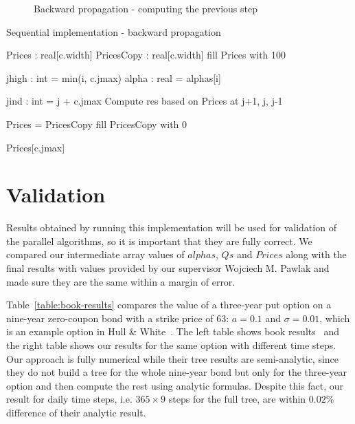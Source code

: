 \begin{figure}[H]
    \centering
    \def\svgwidth{0.5\textwidth}
	\caption{Backward propagation - computing the previous step}
    
	\label{fig:seqbackward}
\end{figure}

\begin{algorithm}[H]
    \DontPrintSemicolon
    \setcounter{AlgoLine}{42}
    \caption{Sequential implementation - backward propagation\label{alg:sequential-backward}}
    
    \;
    Prices : real[c.width]\;
    PricesCopy : real[c.width]\;
    fill Prices with 100 
    
     {
        jhigh : int = min(i, c.jmax)\;
        alpha : real = alphas[i]\;
        
         {
            jind : int = j + c.jmax\;
            Compute res based on Prices at j+1, j, j-1\;
        }
        
        Prices = PricesCopy\;
        fill PricesCopy with 0\;
    }

    \KwRet Prices[c.jmax]
\end{algorithm}

\section{Validation}\label{section:sequential:validation}

Results obtained by running this implementation will be used for validation of the parallel algorithms, so it is important that they are fully correct. We compared our intermediate array values of $\mathit{alphas}$, $\mathit{Qs}$ and $Prices$ along with the final results with values provided by our supervisor Wojciech M. Pawlak and made sure they are the same within a margin of error.

Table~\ref{table:book-results} compares the value of a three-year put option on a nine-year zero-coupon bond with a strike price of 63: $a = 0.1$ and $\sigma = 0.01$, which is an example option in Hull \& White~\cite[pg. 706]{ofod}. The left table shows book results~\cite[pg. 707]{ofod} and the right table shows our results for the same option with different time steps. Our approach is fully numerical while their tree results are semi-analytic, since they do not build a tree for the whole nine-year bond but only for the three-year option and then compute the rest using analytic formulas. Despite this fact, our result for daily time steps, i.e. $365 \times 9$ steps for the full tree, are within $0.02\%$ difference of their analytic result.

